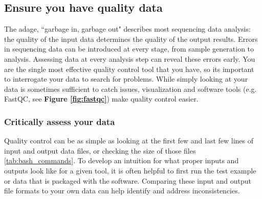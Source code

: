 \documentclass[10pt,letterpaper]{article}
\begin{document}



\subsection*{Ensure you have quality data} %

 
The adage, ``garbage in, garbage out" describes most sequencing data analysis: the quality of the input data determines the quality of the output results. 
Errors in sequencing data can be introduced at every stage, from sample generation to analysis. 
Assessing data at every analysis step can reveal these errors early. 
You are the single most effective quality control tool that you have, so its important to interrogate your data to search for problems. 
While simply looking at your data is sometimes sufficient to catch issues, visualization and software tools (e.g. FastQC, see \textbf{Figure \ref{fig:fastqc}}) make quality control easier. 



\subsubsection*{Critically assess your data}
Quality control can be as simple as looking at the first few and last few lines of input and output data files, or checking the size of those files {\ref{tab:bash_commands}}. 
To develop an intuition for what proper inputs and outputs look like for a given tool, it is often helpful to first run the test example or data that is packaged with the software. 
Comparing these input and output file formats to your own data can help identify and address inconsistencies. 
\end{document}
